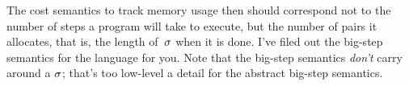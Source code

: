 \documentclass{article}
\begin{document}
{
  \centering
  \def \MathparLineskip {\lineskip=0.43cm}
}

The cost semantics to track memory usage then should correspond not to the
number of steps a program will take to execute, but the number of pairs it
allocates, that is, the length of~$\sigma$ when it is done.
%
I've filed out the big-step semantics for the language for you.
%
Note that the big-step semantics {\em don't} carry around a $\sigma$; that's
too low-level a detail for the abstract big-step semantics.
\end{document}
